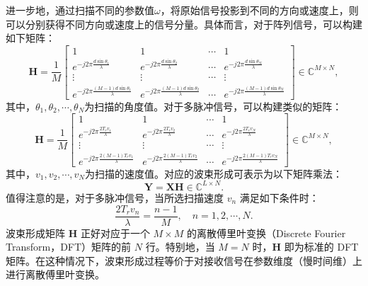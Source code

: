进一步地，通过扫描不同的参数值\( \omega \)，将原始信号投影到不同的方向或速度上，则可以分别获得不同方向或速度上的信号分量。具体而言，对于阵列信号，可以构建如下矩阵：
\[
    \mathbf{H} = \frac{1}{M}\begin{bmatrix}
        1                                                   & 1                                                    & \cdots & 1                                                   \\
        e^{- j 2 \pi \frac{d \sin \theta_1}{\lambda}}       & e^{- j 2 \pi \frac{d \sin \theta_2}{\lambda}}        & \cdots & e^{- j 2 \pi \frac{d \sin \theta_N}{\lambda}}       \\
        \vdots                                              & \vdots                                               & \cdots & \vdots                                              \\
        e^{- j 2 \pi \frac{(M-1) d \sin \theta_1}{\lambda}} & e^{- j 2 \pi \frac{ (M-1) d \sin \theta_2}{\lambda}} & \cdots & e^{- j 2 \pi \frac{(M-1) d \sin \theta_N}{\lambda}}
    \end{bmatrix}\in \mathbb{C}^{M \times N},
\]
其中，\( \theta_1, \theta_2, \cdots, \theta_N \)为扫描的角度值。对于多脉冲信号，可以构建类似的矩阵：
\[
    \mathbf{H} = \frac{1}{M}\begin{bmatrix}
        1                                             & 1                                             & \cdots & 1                                             \\
        e^{- j 2 \pi \frac{2 T_r v_1}{\lambda}}       & e^{- j 2 \pi \frac{2 T_r v_2}{\lambda}}       & \cdots & e^{- j 2 \pi \frac{2 T_r v_N}{\lambda}}       \\
        \vdots                                        & \vdots                                        & \cdots & \vdots                                        \\
        e^{- j 2 \pi \frac{2 (M-1) T_r v_1}{\lambda}} & e^{- j 2 \pi \frac{2 (M-1) T_r v_2}{\lambda}} & \cdots & e^{- j 2 \pi \frac{2 (M-1) T_r v_N}{\lambda}}
    \end{bmatrix} \in \mathbb{C}^{M \times N},
\]
其中，\( v_1, v_2, \cdots, v_N \)为扫描的速度值。对应的波束形成可表示为以下矩阵乘法：
\[
    \mathbf{Y} = \mathbf{X} \mathbf{H} \in \mathbb{C}^{L \times N}.
\]
值得注意的是，对于多脉冲信号，当所选扫描速度 $v_n$ 满足如下条件时：
\[
    \frac{2 T_r v_n}{\lambda} = \frac{n-1}{M}, \quad n = 1, 2, \cdots, N.
\]
波束形成矩阵 $\mathbf{H}$ 正好对应于一个 $M \times M$ 的离散傅里叶变换（Discrete Fourier Transform，DFT）矩阵的前 $N$ 行。特别地，当 $M = N$ 时，$\mathbf{H}$ 即为标准的 DFT 矩阵。在这种情况下，波束形成过程等价于对接收信号在参数维度（慢时间维）上进行离散傅里叶变换。

